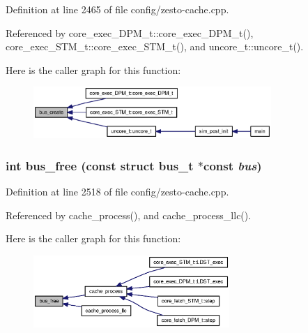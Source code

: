 Definition at line 2465 of file config/zesto-cache.cpp.

Referenced by core\_\-exec\_\-DPM\_\-t::core\_\-exec\_\-DPM\_\-t(), core\_\-exec\_\-STM\_\-t::core\_\-exec\_\-STM\_\-t(), and uncore\_\-t::uncore\_\-t().

Here is the caller graph for this function:\nopagebreak
\begin{figure}[H]
\begin{center}
\leavevmode
\includegraphics[width=256pt]{config_2zesto-cache_8cpp_cf58fdfdf1939cc2b0b05b50ac0eedd8_icgraph}
\end{center}
\end{figure}
\subsubsection[{bus\_\-free}]{\setlength{\rightskip}{0pt plus 5cm}int bus\_\-free (const struct {\bf bus\_\-t} $\ast$const  {\em bus})}\label{config_2zesto-cache_8cpp_24292dcf41327971f03a4c7150cbdf28}




Definition at line 2518 of file config/zesto-cache.cpp.

Referenced by cache\_\-process(), and cache\_\-process\_\-llc().

Here is the caller graph for this function:\nopagebreak
\begin{figure}[H]
\begin{center}
\leavevmode
\includegraphics[width=211pt]{config_2zesto-cache_8cpp_24292dcf41327971f03a4c7150cbdf28_icgraph}
\end{center}
\end{figure}
